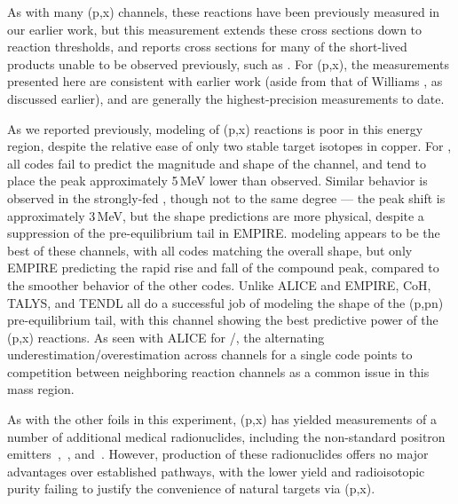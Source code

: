 As with many (p,x) channels, these reactions have been previously measured in our earlier work, but this measurement extends these cross sections down to reaction thresholds, and reports cross sections for many of the short-lived products unable to be observed previously, such as  \cite{Voyles2018a}.
For (p,x), the measurements presented here are consistent with earlier work (aside from that of Williams \cite{PhysRev.162.1055}, as discussed earlier), and are generally the highest-precision measurements to date.


As we reported previously, modeling of (p,x) reactions is poor in this energy region, despite the relative ease of only two stable target isotopes in copper.
For , all codes fail to predict the magnitude and shape of the channel, and tend to place the peak approximately 5\,MeV lower than observed.
Similar behavior is observed in the strongly-fed , though not to the same degree --- the peak shift is approximately 3\,MeV, but the shape predictions are more physical, despite a suppression of the pre-equilibrium tail in  EMPIRE.
 modeling appears to be the best of these channels, with all codes matching the overall shape, but only EMPIRE predicting the rapid rise and fall of the compound peak, compared to the smoother behavior of the other codes.
Unlike ALICE and EMPIRE, CoH, TALYS, and TENDL all do a successful job of modeling the shape of the (p,pn) pre-equilibrium tail, with this channel showing the best predictive power of the (p,x) reactions.
As seen with ALICE for /, the alternating underestimation/overestimation across channels for a single code points to competition between neighboring reaction channels as a common issue in this mass region.




As with the other foils in this experiment, (p,x)  has  yielded measurements of  a number of additional  medical  radionuclides,  including the non-standard positron emitters 
\,\cite{PMID:7632762,zweit1996medium,Graves2016,Rosch2014}, 
\,\cite{Szelecsenyi2005a,Fukumura2004}, and
\,\cite{Lewis2003,Bandari2014,mp500671j,Szelecsenyi1993,Aslam2009,Hilgers2003,Szelecsenyi2005,Voyles2017}.
However, production of these radionuclides  offers no major advantages over established  pathways, with the  lower yield and radioisotopic purity failing to justify the convenience of natural targets  via    (p,x). 



